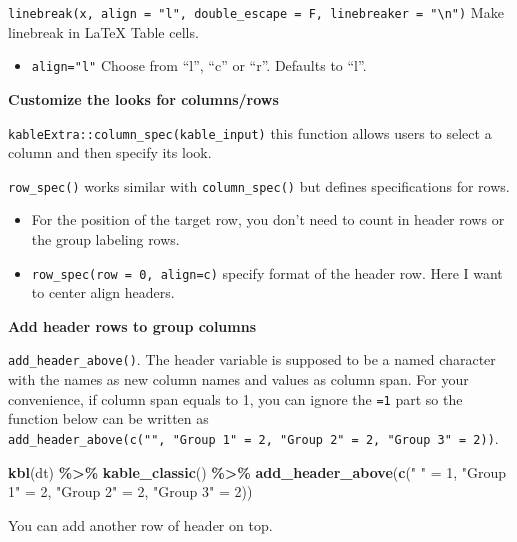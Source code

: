 \documentclass[
  a4paper,
  twoside,
  openright]{book}
\newenvironment{Shaded}{\begin{snugshade}}{\end{snugshade}}
\newcommand{\DecValTok}[1]{\textcolor[rgb]{0.00,0.00,0.81}{#1}}
\newcommand{\FunctionTok}[1]{\textcolor[rgb]{0.13,0.29,0.53}{\textbf{#1}}}
\newcommand{\NormalTok}[1]{#1}
\newcommand{\OtherTok}[1]{\textcolor[rgb]{0.56,0.35,0.01}{#1}}
\newcommand{\SpecialCharTok}[1]{\textcolor[rgb]{0.81,0.36,0.00}{\textbf{#1}}}
\newcommand{\StringTok}[1]{\textcolor[rgb]{0.31,0.60,0.02}{#1}}
\providecommand{\tightlist}{%
  \setlength{\itemsep}{0pt}\setlength{\parskip}{0pt}}
\theoremstyle{definition}
\theoremstyle{definition}
\theoremstyle{definition}
\theoremstyle{definition}
\theoremstyle{remark}
\begin{document}
\texttt{linebreak(x,\ align\ =\ "l",\ double\_escape\ =\ F,\ linebreaker\ =\ "\textbackslash{}n")} Make linebreak in LaTeX Table cells.

\begin{itemize}
\tightlist
\item
  \texttt{align="l"} Choose from ``l'', ``c'' or ``r''. Defaults to ``l''.
\end{itemize}

\textbf{Customize the looks for columns/rows}

\texttt{kableExtra::column\_spec(kable\_input)} this function allows users to select a column and then specify its look.

\texttt{row\_spec()} works similar with \texttt{column\_spec()} but defines specifications for rows.

\begin{itemize}
\tightlist
\item
  For the position of the target row, you don't need to count in header rows or the group labeling rows.
\item
  \texttt{row\_spec(row\ =\ 0,\ align=\textquotesingle{}c\textquotesingle{})} specify format of the header row. Here I want to center align headers.
\end{itemize}

\textbf{Add header rows to group columns}

\texttt{add\_header\_above()}. The header variable is supposed to be a named character with the names as new column names and values as column span. For your convenience, if column span equals to 1, you can ignore the \texttt{=1} part so the function below can be written as \texttt{add\_header\_above(c("",\ "Group\ 1"\ =\ 2,\ "Group\ 2"\ =\ 2,\ "Group\ 3"\ =\ 2))}.

\begin{Shaded}
\begin{Highlighting}[]
\FunctionTok{kbl}\NormalTok{(dt) }\SpecialCharTok{\%\textgreater{}\%}
  \FunctionTok{kable\_classic}\NormalTok{() }\SpecialCharTok{\%\textgreater{}\%}
  \FunctionTok{add\_header\_above}\NormalTok{(}\FunctionTok{c}\NormalTok{(}\StringTok{" "} \OtherTok{=} \DecValTok{1}\NormalTok{, }\StringTok{"Group 1"} \OtherTok{=} \DecValTok{2}\NormalTok{, }\StringTok{"Group 2"} \OtherTok{=} \DecValTok{2}\NormalTok{, }\StringTok{"Group 3"} \OtherTok{=} \DecValTok{2}\NormalTok{))}
\end{Highlighting}
\end{Shaded}

You can add another row of header on top.
\end{document}
